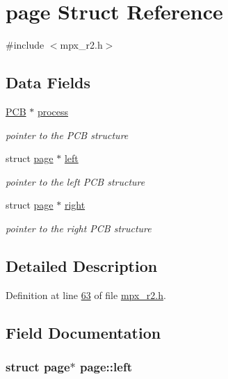 \hypertarget{structpage}{
\section{page Struct Reference}
\label{structpage}
}


{\ttfamily \#include $<$mpx\_\-r2.h$>$}

\subsection*{Data Fields}
\begin{DoxyCompactItemize}
\item 
\hyperlink{structprocess}{PCB} $\ast$ \hyperlink{structpage_af3cc0e1320b79159b230f154f1a95f0d}{process}
\begin{DoxyCompactList}\small\item\em pointer to the PCB structure \item\end{DoxyCompactList}\item 
struct \hyperlink{structpage}{page} $\ast$ \hyperlink{structpage_aea88d51a55db952658327da1995fc8aa}{left}
\begin{DoxyCompactList}\small\item\em pointer to the left PCB structure \item\end{DoxyCompactList}\item 
struct \hyperlink{structpage}{page} $\ast$ \hyperlink{structpage_a72bca7218659f6f6e4e94cc0bacc26d1}{right}
\begin{DoxyCompactList}\small\item\em pointer to the right PCB structure \item\end{DoxyCompactList}\end{DoxyCompactItemize}


\subsection{Detailed Description}


Definition at line \hyperlink{mpx__r2_8h_source_l00063}{63} of file \hyperlink{mpx__r2_8h_source}{mpx\_\-r2.h}.



\subsection{Field Documentation}
\hypertarget{structpage_aea88d51a55db952658327da1995fc8aa}{
\subsubsection[{left}]{\setlength{\rightskip}{0pt plus 5cm}struct {\bf page}$\ast$ {\bf page::left}}}
\label{structpage_aea88d51a55db952658327da1995fc8aa}


